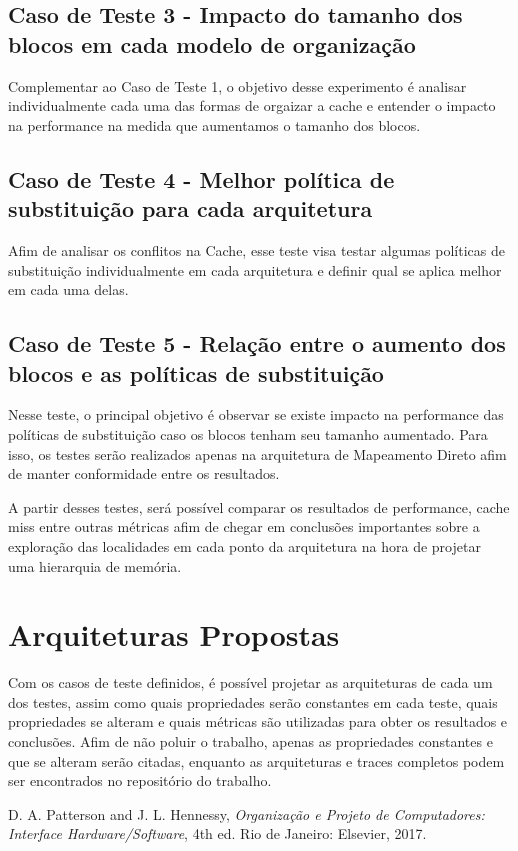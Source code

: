 \documentclass[conference]{IEEEtran}
\begin{document}
\subsection{Caso de Teste 3 - Impacto do tamanho dos blocos em cada modelo de organização}
Complementar ao Caso de Teste 1, o objetivo desse experimento é analisar individualmente cada uma das formas de orgaizar a cache e entender o impacto na performance na medida que aumentamos o tamanho dos blocos.

\subsection{Caso de Teste 4 - Melhor política de substituição para cada arquitetura}
Afim de analisar os conflitos na Cache, esse teste visa testar algumas políticas de substituição individualmente em cada arquitetura e definir qual se aplica melhor em cada uma delas.

\subsection{Caso de Teste 5 - Relação entre o aumento dos blocos e as políticas de substituição}
Nesse teste, o principal objetivo é observar se existe impacto na performance das políticas de substituição caso os blocos tenham seu tamanho aumentado. Para isso, os testes serão realizados apenas na arquitetura de Mapeamento Direto afim de manter conformidade entre os resultados.

A partir desses testes, será possível comparar os resultados de performance, cache miss entre outras métricas afim de chegar em conclusões importantes sobre a exploração das localidades em cada ponto da arquitetura na hora de projetar uma hierarquia de memória.


\section{Arquiteturas Propostas}
Com os casos de teste definidos, é possível projetar as arquiteturas de cada um dos testes, assim como quais propriedades serão constantes em cada teste, quais propriedades se alteram e quais métricas são utilizadas para obter os resultados e conclusões. Afim de não poluir o trabalho, apenas as propriedades constantes e que se alteram serão citadas, enquanto as arquiteturas e traces completos podem ser encontrados no repositório do trabalho.


\begin{thebibliography}{00}
 D. A. Patterson and J. L. Hennessy, \textit{Organização e Projeto de Computadores: Interface Hardware/Software}, 4th ed. Rio de Janeiro: Elsevier, 2017.
\end{thebibliography}
\end{document}
